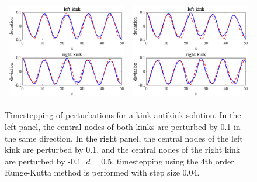 \documentclass[12pt,reqno]{amsart}
\begin{document}


\begin{figure}
	\begin{center}
	\begin{tabular}{cc}
	\includegraphics[width=6cm]{kakoscG1.eps} &
	\includegraphics[width=6cm]{kakoscG2.eps} 
	\end{tabular}
	\end{center}
	\caption{Timestepping of perturbations for a kink-antikink solution. In the left panel, the central nodes of both kinks are perturbed by 0.1 in the same direction. In the right panel, the central nodes of the left kink are perturbed by 0.1, and the central nodes of the right kink are perturbed by -0.1. $d = 0.5$, timestepping using the 4th order Runge-Kutta method
	is performed with step size 0.04.} 
	\label{fig:kaktimestep}
\end{figure}
\end{document}
